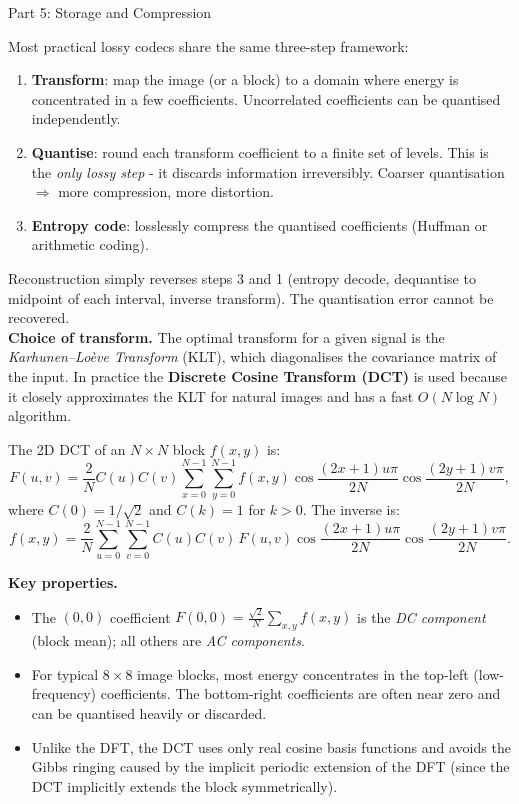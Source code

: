 \documentclass[letterpaper]{article}
\begin{document}
\begin{notes}{Part 5: Storage and Compression}

Most practical lossy codecs share the same three-step framework:
\begin{enumerate}
    \item \textbf{Transform}: map the image (or a block) to a domain where energy is concentrated in a few coefficients. Uncorrelated coefficients can be quantised independently.
    \item \textbf{Quantise}: round each transform coefficient to a finite set of levels. This is the \emph{only lossy step} - it discards information irreversibly. Coarser quantisation $\Rightarrow$ more compression, more distortion.
    \item \textbf{Entropy code}: losslessly compress the quantised coefficients (Huffman or arithmetic coding).
\end{enumerate}
Reconstruction simply reverses steps 3 and 1 (entropy decode, dequantise to midpoint of each interval, inverse transform). The quantisation error cannot be recovered.\\

\textbf{Choice of transform.} The optimal transform for a given signal is the \emph{Karhunen--Loève Transform} (KLT), which diagonalises the covariance matrix of the input. In practice the \textbf{Discrete Cosine Transform (DCT)} is used because it closely approximates the KLT for natural images and has a fast $O(N\log N)$ algorithm.


The 2D DCT of an $N\times N$ block $f(x,y)$ is:
$$F(u,v) = \frac{2}{N}C(u)C(v)\sum_{x=0}^{N-1}\sum_{y=0}^{N-1} f(x,y)\cos\!\frac{(2x+1)u\pi}{2N}\cos\!\frac{(2y+1)v\pi}{2N},$$
where $C(0)=1/\sqrt{2}$ and $C(k)=1$ for $k>0$. The inverse is:
$$f(x,y) = \frac{2}{N}\sum_{u=0}^{N-1}\sum_{v=0}^{N-1} C(u)C(v)\,F(u,v)\cos\!\frac{(2x+1)u\pi}{2N}\cos\!\frac{(2y+1)v\pi}{2N}.$$

\textbf{Key properties.}
\begin{itemize}
    \item The $(0,0)$ coefficient $F(0,0) = \frac{\sqrt{2}}{N}\sum_{x,y} f(x,y)$ is the \emph{DC component} (block mean); all others are \emph{AC components}.
    \item For typical $8\times8$ image blocks, most energy concentrates in the top-left (low-frequency) coefficients. The bottom-right coefficients are often near zero and can be quantised heavily or discarded.
    \item Unlike the DFT, the DCT uses only real cosine basis functions and avoids the Gibbs ringing caused by the implicit periodic extension of the DFT (since the DCT implicitly extends the block symmetrically).
\end{itemize}


\end{notes}
\end{document}
